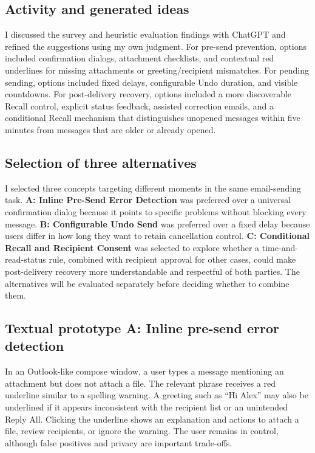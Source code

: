 \documentclass[letterpaper]{jdf}
\begin{document}
\subsection{Activity and generated ideas}

I discussed the survey and heuristic evaluation findings with ChatGPT and refined the suggestions using my own judgment. For pre-send prevention, options included confirmation dialogs, attachment checklists, and contextual red underlines for missing attachments or greeting/recipient mismatches. For pending sending, options included fixed delays, configurable Undo duration, and visible countdowns. For post-delivery recovery, options included a more discoverable Recall control, explicit status feedback, assisted correction emails, and a conditional Recall mechanism that distinguishes unopened messages within five minutes from messages that are older or already opened. 

\subsection{Selection of three alternatives}

I selected three concepts targeting different moments in the same email-sending task. \textbf{A: Inline Pre-Send Error Detection} was preferred over a universal confirmation dialog because it points to specific problems without blocking every message. \textbf{B: Configurable Undo Send} was preferred over a fixed delay because users differ in how long they want to retain cancellation control. \textbf{C: Conditional Recall and Recipient Consent} was selected to explore whether a time-and-read-status rule, combined with recipient approval for other cases, could make post-delivery recovery more understandable and respectful of both parties. The alternatives will be evaluated separately before deciding whether to combine them.

\subsection{Textual prototype A: Inline pre-send error detection}

In an Outlook-like compose window, a user types a message mentioning an attachment but does not attach a file. The relevant phrase receives a red underline similar to a spelling warning. A greeting such as ``Hi Alex'' may also be underlined if it appears inconsistent with the recipient list or an unintended Reply All. Clicking the underline shows an explanation and actions to attach a file, review recipients, or ignore the warning. The user remains in control, although false positives and privacy are important trade-offs.
\end{document}

